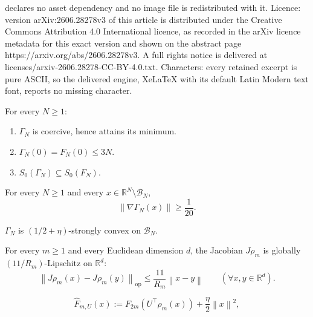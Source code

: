\documentclass[10pt,a4paper]{amsart}
\newcommand{\R}{\mathbb{R}}
\newcommand{\norm}[1]{\left\lVert #1\right\rVert}
\begin{document}
declares no asset dependency and no image file is redistributed with it. Licence: version arXiv:2606.28278v3 of this article is distributed under the Creative Commons Attribution 4.0 International licence, as recorded in the arXiv licence metadata for this exact version and shown on the abstract page https://arxiv.org/abs/2606.28278v3. A full rights notice is delivered at licenses/arxiv-2606.28278-CC-BY-4.0.txt. Characters: every retained excerpt is pure ASCII, so the delivered engine, XeLaTeX with its default Latin Modern text font, reports no missing character.
\begin{lemma}
\label{lem:Gamma-basic}
For every $N\ge 1$:
\begin{enumerate}[label=\arabic*.,leftmargin=1.5em]
    \item $\Gamma_N$ is coercive, hence attains its minimum.
    \item $\Gamma_N(0)=F_N(0)\le 3N$.
    \item $S_0(\Gamma_N)\subseteq S_0(F_N)$.
\end{enumerate}
\end{lemma}

\begin{lemma}
\label{lem:Gamma-outside-box}
For every $N\ge 1$ and every $x\in \R^N\setminus \mathcal B_N$,
\[
\norm{\nabla \Gamma_N(x)}\ge \frac{1}{20}.
\]
\end{lemma}

\begin{lemma}
\label{lem:Gamma-box-strong}
$\Gamma_N$ is $(1/2+\eta)$-strongly convex on $\mathcal B_N$.
\end{lemma}

\begin{lemma}
\label{lem:radial-clipping}
For every $m\ge 1$ and every Euclidean dimension \(d\), the Jacobian $J\rho_m$ is globally
$(11/R_m)$-Lipschitz on \(\R^d\):
\[
\norm{J\rho_m(x)-J\rho_m(y)}_{\mathrm{op}}\le \frac{11}{R_m}\norm{x-y}
\qquad
(\forall x,y\in\R^d).
\]
\end{lemma}

\begin{equation}
\label{eq:hatF-def}
\widehat F_{m,U}(x):=F_{2m}(U^\top \rho_m(x))+\frac{\eta}{2}\norm{x}^2,
\end{equation}
\end{document}
